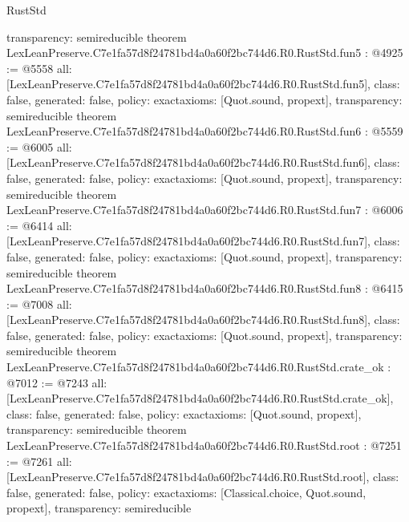 \begin{lexlean}{RustStd}
\begin{coremodule}
{  transparency: semireducible
}
theorem LexLeanPreserve.C7e1fa57d8f24781bd4a0a60f2bc744d6.R0.RustStd.fun5 : @4925 := @5558 {
  all: [LexLeanPreserve.C7e1fa57d8f24781bd4a0a60f2bc744d6.R0.RustStd.fun5],
  class: false,
  generated: false,
  policy: exact{axioms: [Quot.sound, propext]},
  transparency: semireducible
}
theorem LexLeanPreserve.C7e1fa57d8f24781bd4a0a60f2bc744d6.R0.RustStd.fun6 : @5559 := @6005 {
  all: [LexLeanPreserve.C7e1fa57d8f24781bd4a0a60f2bc744d6.R0.RustStd.fun6],
  class: false,
  generated: false,
  policy: exact{axioms: [Quot.sound, propext]},
  transparency: semireducible
}
theorem LexLeanPreserve.C7e1fa57d8f24781bd4a0a60f2bc744d6.R0.RustStd.fun7 : @6006 := @6414 {
  all: [LexLeanPreserve.C7e1fa57d8f24781bd4a0a60f2bc744d6.R0.RustStd.fun7],
  class: false,
  generated: false,
  policy: exact{axioms: [Quot.sound, propext]},
  transparency: semireducible
}
theorem LexLeanPreserve.C7e1fa57d8f24781bd4a0a60f2bc744d6.R0.RustStd.fun8 : @6415 := @7008 {
  all: [LexLeanPreserve.C7e1fa57d8f24781bd4a0a60f2bc744d6.R0.RustStd.fun8],
  class: false,
  generated: false,
  policy: exact{axioms: [Quot.sound, propext]},
  transparency: semireducible
}
theorem LexLeanPreserve.C7e1fa57d8f24781bd4a0a60f2bc744d6.R0.RustStd.crate_ok : @7012 := @7243 {
  all: [LexLeanPreserve.C7e1fa57d8f24781bd4a0a60f2bc744d6.R0.RustStd.crate_ok],
  class: false,
  generated: false,
  policy: exact{axioms: [Quot.sound, propext]},
  transparency: semireducible
}
theorem LexLeanPreserve.C7e1fa57d8f24781bd4a0a60f2bc744d6.R0.RustStd.root : @7251 := @7261 {
  all: [LexLeanPreserve.C7e1fa57d8f24781bd4a0a60f2bc744d6.R0.RustStd.root],
  class: false,
  generated: false,
  policy: exact{axioms: [Classical.choice, Quot.sound, propext]},
  transparency: semireducible
}


\end{coremodule}
\end{lexlean}
